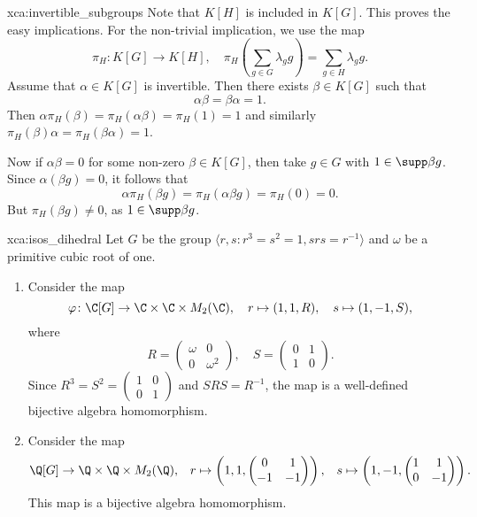 \begin{sol}{xca:invertible_subgroups}
Note that $K[H]$ is included in $K[G]$. This proves the easy implications. For the non-trivial implication, we use the map 
\[ 
\pi_H\colon K[G]\to K[H],\quad \pi_H\left(\sum_{g\in G}\lambda_gg\right)=\sum_{g\in H}\lambda_gg.
\] 
Assume that $\alpha\in K[G]$ is invertible. Then there exists $\beta\in K[G]$ such that \[ 
\alpha\beta=\beta\alpha=1.
\]
Then $\alpha\pi_H(\beta)=\pi_H(\alpha\beta)=\pi_H(1)=1$ and similarly $\pi_H(\beta)\alpha=\pi_H(\beta\alpha)=1$. 

Now if $\alpha\beta=0$ for some non-zero $\beta\in K[G]$, then take $g\in G$ with $1\in\supp \beta g$. Since $\alpha(\beta g)=0$, it follows that 
\[ 
\alpha\pi_H(\beta g)=\pi_H(\alpha\beta g)=\pi_H(0)=0. 
\]
But $\pi_H(\beta g)\ne 0$, as $1\in\supp\beta g$. 
\end{sol}

\begin{sol}{xca:isos_dihedral}
Let $G$ be the group $\langle r,s:r^3=s^2=1,srs=r^{-1}\rangle$ 
and $\omega$ be a primitive cubic root of one. 
\begin{enumerate}
    \item Consider the map 
\[
\varphi\colon \C[G]\to \C\times \C\times M_2(\C),\quad 
r\mapsto (1,1,R),\quad 
s\mapsto (1,-1,S),
\]
where 
\[
R=\begin{pmatrix}
    \omega & 0\\
    0 & \omega^2
\end{pmatrix},\quad 
S=\begin{pmatrix}
    0 & 1 \\
    1 & 0
    \end{pmatrix}. 
\] 
Since $R^3=S^2=\begin{pmatrix}1&0\\0&1\end{pmatrix}$ and $SRS=R^{-1}$, the map 
is a well-defined bijective algebra homomorphism. 
\item Consider the map 
\begin{align*} 
\Q[G]\to\Q\times\Q\times M_2(\Q),&&
r\mapsto \left(1,1,\begin{pmatrix}0&1\\-1&-1\end{pmatrix}\right),&&
s\mapsto \left(1,-1,\begin{pmatrix}1&1\\0&-1\end{pmatrix}\right). 
\end{align*}
This map is a bijective algebra homomorphism. 
\end{enumerate}
\end{sol}

